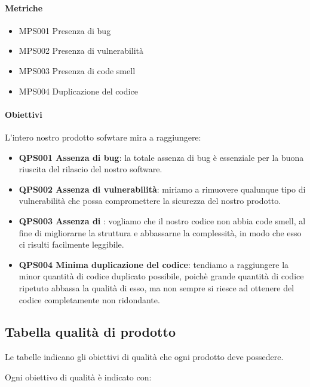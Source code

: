		\paragraph*{Metriche} 
		\begin{itemize}
			\item MPS001 Presenza di bug
			\item MPS002 Presenza di vulnerabilità
			\item MPS003 Presenza di code smell
			\item MPS004 Duplicazione del codice
		\end{itemize} 

		\paragraph*{Obiettivi} 	
		L'intero nostro prodotto sofwtare mira a raggiungere:
		\begin{itemize}
			\item \textbf{QPS001 Assenza di bug}: la totale assenza di bug è essenziale per la buona riuscita del rilascio del nostro software.
			\item \textbf{QPS002 Assenza di vulnerabilità}: miriamo a rimuovere qualunque tipo di vulnerabilità che possa compromettere la sicurezza del nostro prodotto.
			\item \textbf{QPS003 Assenza di }: vogliamo che il nostro codice non abbia code smell, al fine di migliorarne la struttura e abbassarne la complessità, in modo che esso ci risulti facilmente leggibile.
			\item \textbf{QPS004 Minima duplicazione del codice}: tendiamo a raggiungere la minor quantità di codice duplicato possibile, poichè grande quantità di codice ripetuto abbassa la qualità di esso, ma non sempre si riesce ad ottenere del codice completamente non ridondante.
		\end{itemize}


\subsection{Tabella qualità di prodotto}
Le tabelle indicano gli obiettivi di qualità che ogni prodotto deve possedere.

Ogni obiettivo di qualità è indicato con:

